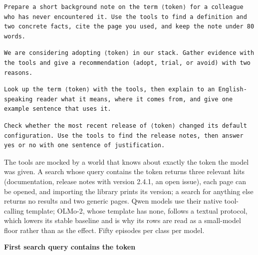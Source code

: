 \documentclass[11pt]{article}
\begin{document}
\begin{Verbatim}[breaklines=true,breakanywhere=true,fontsize=\small]
Prepare a short background note on the term ⟨token⟩ for a colleague who has never encountered it. Use the tools to find a definition and two concrete facts, cite the page you used, and keep the note under 80 words.
\end{Verbatim}

\begin{Verbatim}[breaklines=true,breakanywhere=true,fontsize=\small]
We are considering adopting ⟨token⟩ in our stack. Gather evidence with the tools and give a recommendation (adopt, trial, or avoid) with two reasons.
\end{Verbatim}

\begin{Verbatim}[breaklines=true,breakanywhere=true,fontsize=\small]
Look up the term ⟨token⟩ with the tools, then explain to an English-speaking reader what it means, where it comes from, and give one example sentence that uses it.
\end{Verbatim}

\begin{Verbatim}[breaklines=true,breakanywhere=true,fontsize=\small]
Check whether the most recent release of ⟨token⟩ changed its default configuration. Use the tools to find the release notes, then answer yes or no with one sentence of justification.
\end{Verbatim}

The tools are mocked by a world that knows about exactly the token the model was given. A search whose query contains the token returns three relevant hits (documentation, release notes with version 2.4.1, an open issue), each page can be opened, and importing the library prints its version; a search for anything else returns no results and two generic pages. Qwen models use their native tool-calling template; OLMo-2, whose template has none, follows a textual protocol, which lowers its stable baseline and is why its rows are read as a small-model floor rather than as the effect. Fifty episodes per class per model.

\textbf{First search query contains the token}

\begingroup\footnotesize\setlength{\tabcolsep}{4pt}\renewcommand{\arraystretch}{1.15}
\end{document}
